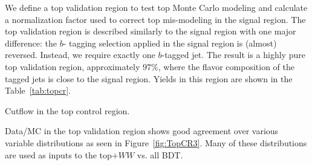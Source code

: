 We define a top validation region to test top Monte Carlo modeling and calculate a normalization factor used to correct top mis-modeling in the signal region. The top validation region is described similarly to the signal region with one major difference: the $b$- tagging selection applied in the signal region is (almost) reversed. Instead, we require exactly one $b$-tagged jet. The result is a highly pure top validation region, approximately $97\%$, where the flavor composition of the tagged jets is close to the signal region. Yields in this region are shown in the Table~\ref{tab:topcr}.

\begin{table}[h!]
\centering
\scalebox{0.63}{

}
\caption{Cutflow in the top control region.}
\label{tab:topcr}
\end{table}

Data/MC in the top validation region shows good agreement over various variable distributions as seen in Figure~\ref{fig:TopCR3}. Many of these distributions are used as inputs to the top$+WW$ vs. all BDT. 

